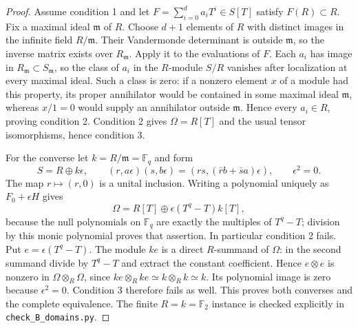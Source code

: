 \begin{proof}
Assume condition 1 and let $F=\sum_{i=0}^d a_iT^i\in S[T]$
satisfy $F(R)\subset R$. Fix a maximal ideal $\mathfrak m$ of $R$.
Choose $d+1$ elements of $R$ with distinct images in the infinite
field $R/\mathfrak m$. Their Vandermonde determinant is outside
$\mathfrak m$, so the inverse matrix exists over $R_{\mathfrak m}$.
Apply it to the evaluations of $F$. Each $a_i$ has image in
$R_{\mathfrak m}\subset S_{\mathfrak m}$, so the class of $a_i$ in
the $R$-module $S/R$ vanishes after localization at every maximal
ideal. Such a class is zero: if a nonzero element $x$ of a module
had this property, its proper annihilator would be contained in
some maximal ideal $\mathfrak m$, whereas $x/1=0$ would supply
an annihilator outside $\mathfrak m$. Hence every $a_i\in R$,
proving condition 2. Condition 2 gives $\Omega=R[T]$ and the
usual tensor isomorphisms, hence condition 3.

For the converse let $k=R/\mathfrak m=\mathbb F_q$ and form
\[
 S=R\oplus k\epsilon,\qquad
 (r,a\epsilon)(s,b\epsilon)
  =(rs,(\bar r b+\bar s a)\epsilon),\qquad \epsilon^2=0.
\]
The map $r\mapsto(r,0)$ is a unital inclusion. Writing a polynomial
uniquely as $F_0+\epsilon H$ gives
\[
 \Omega=R[T]\oplus\epsilon(T^q-T)k[T],
\]
because the null polynomials on $\mathbb F_q$ are exactly the
multiples of $T^q-T$; division by this monic polynomial proves
that assertion. In particular condition 2 fails. Put
$e=\epsilon(T^q-T)$. The module $ke$ is a direct $R$-summand of
$\Omega$: in the second summand divide by $T^q-T$ and extract
the constant coefficient. Hence $e\otimes e$ is nonzero in
$\Omega\otimes_R\Omega$, since
$ke\otimes_Rke\simeq k\otimes_Rk\simeq k$.
Its polynomial image is zero because $\epsilon^2=0$.
Condition 3 therefore fails as well. This proves both converses
and the complete equivalence. The finite $R=k=\mathbb F_2$
instance is checked explicitly in \texttt{check\_B\_domains.py}.
\end{proof}

